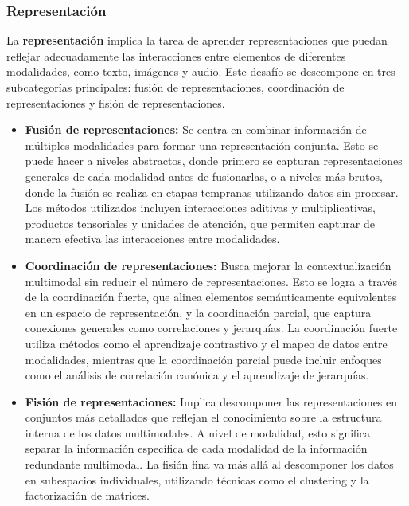 \documentclass[../tesis.tex]{subfiles}
\begin{document}
\subsubsection{Representación}
La \textbf{representación} implica la tarea de aprender representaciones que puedan reflejar adecuadamente las interacciones entre elementos de diferentes modalidades, como texto, imágenes y audio. Este desafío se descompone en tres subcategorías principales: fusión de representaciones, coordinación de representaciones y fisión de representaciones.\par\null\par

\begin{itemize}
    \item \textbf{Fusión de representaciones:} Se centra en combinar información de múltiples modalidades para formar una representación conjunta. Esto se puede hacer a niveles abstractos, donde primero se capturan representaciones generales de cada modalidad antes de fusionarlas, o a niveles más brutos, donde la fusión se realiza en etapas tempranas utilizando datos sin procesar. Los métodos utilizados incluyen interacciones aditivas y multiplicativas, productos tensoriales y unidades de atención, que permiten capturar de manera efectiva las interacciones entre modalidades.
    \item \textbf{Coordinación de representaciones:} Busca mejorar la contextualización multimodal sin reducir el número de representaciones. Esto se logra a través de la coordinación fuerte, que alinea elementos semánticamente equivalentes en un espacio de representación, y la coordinación parcial, que captura conexiones generales como correlaciones y jerarquías. La coordinación fuerte utiliza métodos como el aprendizaje contrastivo y el mapeo de datos entre modalidades, mientras que la coordinación parcial puede incluir enfoques como el análisis de correlación canónica y el aprendizaje de jerarquías.
    \item \textbf{Fisión de representaciones:} Implica descomponer las representaciones en conjuntos más detallados que reflejan el conocimiento sobre la estructura interna de los datos multimodales. A nivel de modalidad, esto significa separar la información específica de cada modalidad de la información redundante multimodal. La fisión fina va más allá al descomponer los datos en subespacios individuales, utilizando técnicas como el clustering y la factorización de matrices.
\end{itemize}
\end{document}
